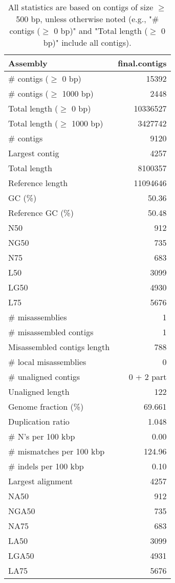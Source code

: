 \documentclass[12pt,a4paper]{article}
\begin{document}
\begin{table}[ht]
\begin{center}
\caption{All statistics are based on contigs of size $\geq$ 500 bp, unless otherwise noted (e.g., "\# contigs ($\geq$ 0 bp)" and "Total length ($\geq$ 0 bp)" include all contigs).}
\begin{tabular}{|l*{1}{|r}|}
\hline
Assembly & final.contigs \\ \hline
\# contigs ($\geq$ 0 bp) & 15392 \\ \hline
\# contigs ($\geq$ 1000 bp) & 2448 \\ \hline
Total length ($\geq$ 0 bp) & 10336527 \\ \hline
Total length ($\geq$ 1000 bp) & 3427742 \\ \hline
\# contigs & 9120 \\ \hline
Largest contig & 4257 \\ \hline
Total length & 8100357 \\ \hline
Reference length & 11094646 \\ \hline
GC (\%) & 50.36 \\ \hline
Reference GC (\%) & 50.48 \\ \hline
N50 & 912 \\ \hline
NG50 & 735 \\ \hline
N75 & 683 \\ \hline
L50 & 3099 \\ \hline
LG50 & 4930 \\ \hline
L75 & 5676 \\ \hline
\# misassemblies & 1 \\ \hline
\# misassembled contigs & 1 \\ \hline
Misassembled contigs length & 788 \\ \hline
\# local misassemblies & 0 \\ \hline
\# unaligned contigs & 0 + 2 part \\ \hline
Unaligned length & 122 \\ \hline
Genome fraction (\%) & 69.661 \\ \hline
Duplication ratio & 1.048 \\ \hline
\# N's per 100 kbp & 0.00 \\ \hline
\# mismatches per 100 kbp & 124.96 \\ \hline
\# indels per 100 kbp & 0.10 \\ \hline
Largest alignment & 4257 \\ \hline
NA50 & 912 \\ \hline
NGA50 & 735 \\ \hline
NA75 & 683 \\ \hline
LA50 & 3099 \\ \hline
LGA50 & 4931 \\ \hline
LA75 & 5676 \\ \hline
\end{tabular}
\end{center}
\end{table}
\end{document}
